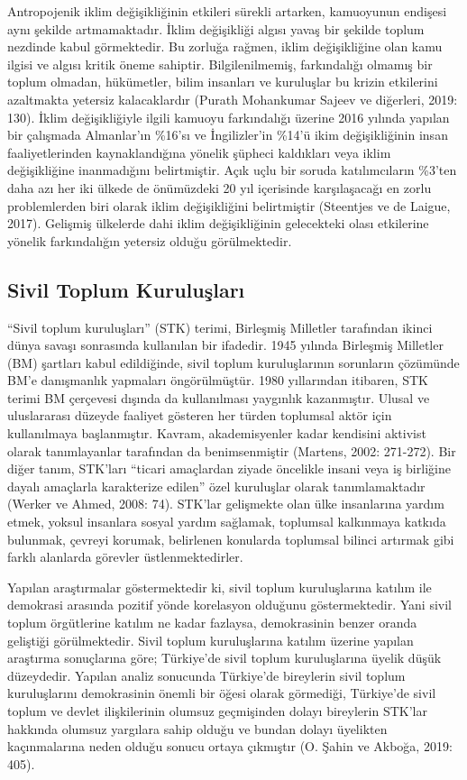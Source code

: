 \documentclass[
]{book}
\begin{document}
Antropojenik iklim değişikliğinin etkileri sürekli artarken, kamuoyunun endişesi aynı şekilde artmamaktadır. İklim değişikliği algısı yavaş bir şekilde toplum nezdinde kabul görmektedir. Bu zorluğa rağmen, iklim değişikliğine olan kamu ilgisi ve algısı kritik öneme sahiptir. Bilgilenilmemiş, farkındalığı olmamış bir toplum olmadan, hükümetler, bilim insanları ve kuruluşlar bu krizin etkilerini azaltmakta yetersiz kalacaklardır (Purath Mohankumar Sajeev ve diğerleri, 2019: 130). İklim değişikliğiyle ilgili kamuoyu farkındalığı üzerine 2016 yılında yapılan bir çalışmada Almanlar'ın \%16'sı ve İngilizler'in \%14'ü ikim değişikliğinin insan faaliyetlerinden kaynaklandığına yönelik şüpheci kaldıkları veya iklim değişikliğine inanmadığını belirtmiştir. Açık uçlu bir soruda katılımcıların \%3'ten daha azı her iki ülkede de önümüzdeki 20 yıl içerisinde karşılaşacağı en zorlu problemlerden biri olarak iklim değişikliğini belirtmiştir (Steentjes ve de Laigue, 2017). Gelişmiş ülkelerde dahi iklim değişikliğinin gelecekteki olası etkilerine yönelik farkındalığın yetersiz olduğu görülmektedir.

\hypertarget{sivil-toplum-kuruluux15flarux131}{%
\subsection{Sivil Toplum Kuruluşları}\label{sivil-toplum-kuruluux15flarux131}}

``Sivil toplum kuruluşları'' (STK) terimi, Birleşmiş Milletler tarafından ikinci dünya savaşı sonrasında kullanılan bir ifadedir. 1945 yılında Birleşmiş Milletler (BM) şartları kabul edildiğinde, sivil toplum kuruluşlarının sorunların çözümünde BM'e danışmanlık yapmaları öngörülmüştür. 1980 yıllarından itibaren, STK terimi BM çerçevesi dışında da kullanılması yaygınlık kazanmıştır. Ulusal ve uluslararası düzeyde faaliyet gösteren her türden toplumsal aktör için kullanılmaya başlanmıştır. Kavram, akademisyenler kadar kendisini aktivist olarak tanımlayanlar tarafından da benimsenmiştir (Martens, 2002: 271-272). Bir diğer tanım, STK'ları ``ticari amaçlardan ziyade öncelikle insani veya iş birliğine dayalı amaçlarla karakterize edilen'' özel kuruluşlar olarak tanımlamaktadır (Werker ve Ahmed, 2008: 74). STK'lar gelişmekte olan ülke insanlarına yardım etmek, yoksul insanlara sosyal yardım sağlamak, toplumsal kalkınmaya katkıda bulunmak, çevreyi korumak, belirlenen konularda toplumsal bilinci artırmak gibi farklı alanlarda görevler üstlenmektedirler.

Yapılan araştırmalar göstermektedir ki, sivil toplum kuruluşlarına katılım ile demokrasi arasında pozitif yönde korelasyon olduğunu göstermektedir. Yani sivil toplum örgütlerine katılım ne kadar fazlaysa, demokrasinin benzer oranda geliştiği görülmektedir. Sivil toplum kuruluşlarına katılım üzerine yapılan araştırma sonuçlarına göre; Türkiye'de sivil toplum kuruluşlarına üyelik düşük düzeydedir. Yapılan analiz sonucunda Türkiye'de bireylerin sivil toplum kuruluşlarını demokrasinin önemli bir öğesi olarak görmediği, Türkiye'de sivil toplum ve devlet ilişkilerinin olumsuz geçmişinden dolayı bireylerin STK'lar hakkında olumsuz yargılara sahip olduğu ve bundan dolayı üyelikten kaçınmalarına neden olduğu sonucu ortaya çıkmıştır (O. Şahin ve Akboğa, 2019: 405).
\end{document}
